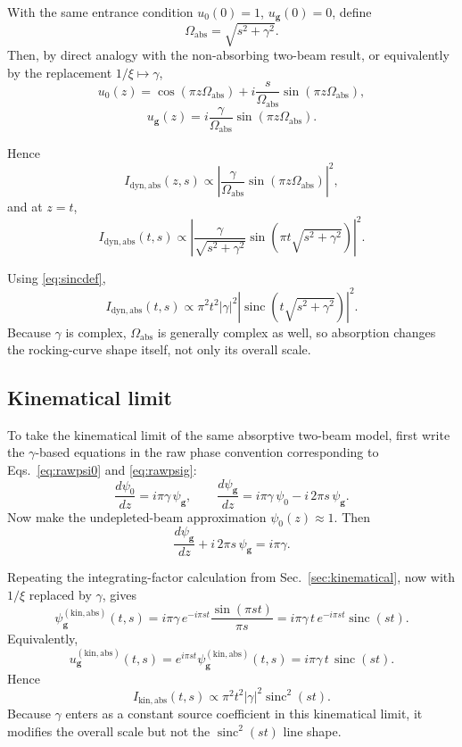 \documentclass[11pt]{article}
\begin{document}
With the same entrance condition \(u_0(0)=1\), \(u_{\mathbf g}(0)=0\), define
\[
\Omega_{\mathrm{abs}}=\sqrt{s^2+\gamma^2}.
\]
Then, by direct analogy with the non-absorbing two-beam result, or equivalently by the replacement \(1/\xi \mapsto \gamma\),
\[
u_0(z)=\cos(\pi z\Omega_{\mathrm{abs}})
+i\frac{s}{\Omega_{\mathrm{abs}}}\sin(\pi z\Omega_{\mathrm{abs}}),
\]
\[
u_{\mathbf g}(z)=
i\frac{\gamma}{\Omega_{\mathrm{abs}}}\sin(\pi z\Omega_{\mathrm{abs}}).
\]

Hence
\[
I_{\mathrm{dyn,abs}}(z,s)\propto
\left|
\frac{\gamma}{\Omega_{\mathrm{abs}}}
\sin(\pi z\Omega_{\mathrm{abs}})
\right|^2,
\]
and at \(z=t\),
\[
I_{\mathrm{dyn,abs}}(t,s)
\propto
\left|
\frac{\gamma}{\sqrt{s^2+\gamma^2}}
\sin\!\left(\pi t\sqrt{s^2+\gamma^2}\right)
\right|^2.
\]

Using \eqref{eq:sincdef},
\[
I_{\mathrm{dyn,abs}}(t,s)
\propto
\pi^2 t^2 |\gamma|^2
\left|
\operatorname{sinc}\!\left(t\sqrt{s^2+\gamma^2}\right)
\right|^2.
\]
Because \(\gamma\) is complex, \(\Omega_{\mathrm{abs}}\) is generally complex as well, so absorption changes the rocking-curve shape itself, not only its overall scale.

\subsection{Kinematical limit}

To take the kinematical limit of the same absorptive two-beam model, first write the \(\gamma\)-based equations in the raw phase convention corresponding to Eqs.~\eqref{eq:rawpsi0} and \eqref{eq:rawpsig}:
\[
\frac{d \psi_0}{dz}= i\pi \gamma\,\psi_{\mathbf g},
\qquad
\frac{d \psi_{\mathbf g}}{dz}= i\pi \gamma\,\psi_0 - i\,2\pi s\,\psi_{\mathbf g}.
\]
Now make the undepleted-beam approximation \(\psi_0(z)\approx 1\). Then
\[
\frac{d \psi_{\mathbf g}}{dz}+i\,2\pi s\,\psi_{\mathbf g}= i\pi \gamma.
\]

Repeating the integrating-factor calculation from Sec.~\ref{sec:kinematical}, now with \(1/\xi\) replaced by \(\gamma\), gives
\[
\psi_{\mathbf g}^{(\mathrm{kin,abs})}(t,s)
=
i\pi \gamma\,e^{-i\pi s t}\frac{\sin(\pi s t)}{\pi s}
=
i\pi \gamma\,t\,e^{-i\pi s t}\operatorname{sinc}(st).
\]
Equivalently,
\[
u_{\mathbf g}^{(\mathrm{kin,abs})}(t,s)
=
e^{i\pi s t}\psi_{\mathbf g}^{(\mathrm{kin,abs})}(t,s)
=
i\pi \gamma\,t\,\operatorname{sinc}(st).
\]
Hence
\[
I_{\mathrm{kin,abs}}(t,s)
\propto
\pi^2 t^2 |\gamma|^2 \operatorname{sinc}^2(st).
\]
Because \(\gamma\) enters as a constant source coefficient in this kinematical limit, it modifies the overall scale but not the \(\operatorname{sinc}^2(st)\) line shape.
\end{document}
